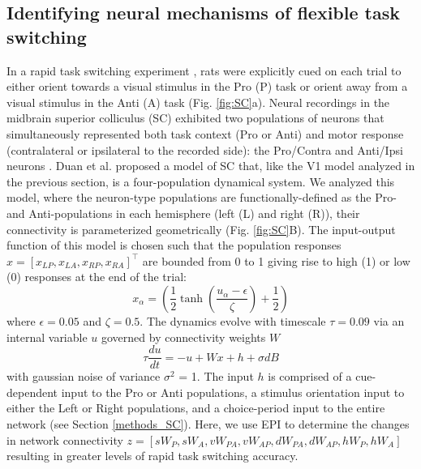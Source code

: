 \documentclass[11pt]{article}
\begin{document}
\subsection{Identifying neural mechanisms of flexible task switching} \label{results_SC}
In a rapid task switching experiment \cite{duan2015requirement}, rats were explicitly cued on each trial to either orient towards a visual stimulus in the Pro (P) task or orient away from a visual stimulus in the Anti (A) task (Fig. \ref{fig:SC}a). Neural recordings in the midbrain superior colliculus (SC) exhibited two populations of neurons that simultaneously represented both task context (Pro or Anti) and motor response (contralateral or ipsilateral to the recorded side): the Pro/Contra and Anti/Ipsi neurons \cite{duan2018collicular}.
Duan et al. proposed a model of SC that, like the V1 model analyzed in the previous section, is a four-population dynamical system.  
We analyzed this model, where the neuron-type populations are functionally-defined as the Pro- and Anti-populations in each hemisphere (left (L) and right (R)), their connectivity is parameterized geometrically  (Fig. \ref{fig:SC}B).
The input-output function of this model is chosen such that the population responses $x = [x_{LP}, x_{LA}, x_{RP}, x_{RA}]^\top$ are bounded from 0 to 1 giving rise to high (1) or low (0) responses at the end of the trial:
\begin{equation}
x_\alpha =\left(\frac{1}{2}\tanh\left(\frac{u_\alpha - \epsilon}{\zeta}\right)+ \frac{1}{2} \right)
\end{equation}
where $\epsilon = 0.05$ and $\zeta = 0.5$.  The dynamics evolve with timescale $\tau=0.09$ via an internal variable $u$ governed by connectivity weights $W$
\begin{equation}
\tau \frac{du}{dt} = -u + Wx + h + \sigma dB
\end{equation}
with gaussian noise of variance $\sigma^2$ = 1.
The input $h$ is comprised of a cue-dependent input to the Pro or Anti populations, a stimulus orientation input to either the Left or Right populations, and a choice-period input to the entire network (see Section \ref{methods_SC}).
Here, we use EPI to determine the changes in network connectivity $z = [ sW_P, sW_A, vW_{PA}, vW_{AP}, dW_{PA}, dW_{AP}, hW_P, hW_A]$ resulting in greater levels of rapid task switching accuracy.
\end{document}
